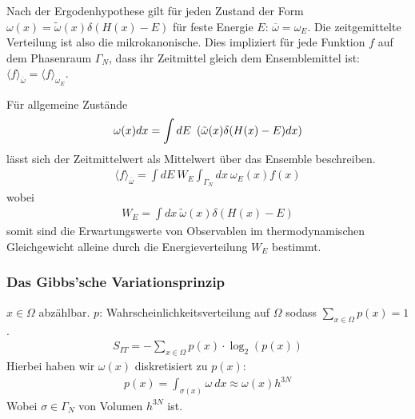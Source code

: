 \vspace{1\baselineskip}

Nach der Ergodenhypothese gilt für jeden Zustand der Form
$\omega(x) = \tilde{\omega}(x) \delta(H(x)-E)$ für feste Energie $E$:
$\overline{\omega} = \omega_E$. Die zeitgemittelte Verteilung ist also die
mikrokanonische. Dies impliziert für jede Funktion $f$ auf dem Phasenraum
$\Gamma_N$, dass ihr Zeitmittel gleich dem Ensemblemittel ist:
$\langle f \rangle_{\overline{\omega}} = \langle f \rangle_{\omega_E}$.

\begin{bemerkung}
    Für allgemeine Zustände
    \begin{align*}
        \omega(x) dx = \int dE \ \left( \tilde{\omega}(x) \delta(H(x) - E) dx \right)
    \end{align*}
    lässt sich der Zeitmittelwert als Mittelwert über das Ensemble beschreiben.
    \begin{align*}
        \langle f \rangle_{\overline{\omega}} = \int d E \ W_E \int_{\Gamma_N} dx \ \omega_E (x) f(x)
    \end{align*}
    wobei
    \begin{align*}
        W_E = \int dx \ \tilde{\omega}(x) \delta(H(x)-E)
    \end{align*}
    somit sind die Erwartungswerte von Observablen im thermodynamischen
    Gleichgewicht alleine durch die Energieverteilung $W_E$ bestimmt.
\end{bemerkung}

\subsubsection{Das Gibbs'sche Variationsprinzip}

\begin{definition}
    $x \in \Omega$ abzählbar. $p$: Wahrscheinlichkeitsverteilung auf $\Omega$
    sodass $\sum_{x \in \Omega} p(x) = 1$.
    \begin{align*}
        S_{IT} = - \sum_{x \in \Omega} p(x) \cdot \log_2 (p(x))
    \end{align*}
    Hierbei haben wir $\omega(x)$ diskretisiert zu $p(x)$:
    \begin{align*}
        p(x) = \int_{\sigma(x)} \omega \ dx \approx \omega(x) h^{3N}
    \end{align*}
    Wobei $\sigma \in \Gamma_N$ von Volumen $h^{3N}$ ist.
\end{definition}

